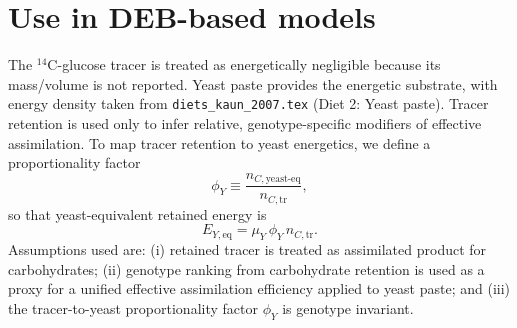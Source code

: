 \documentclass[11pt]{article}
\begin{document}
\section*{Use in DEB-based models}
The $^{14}$C-glucose tracer is treated as energetically negligible because its mass/volume is not reported. Yeast paste provides the energetic substrate, with energy density taken from \texttt{diets\_kaun\_2007.tex} (Diet 2: Yeast paste). Tracer retention is used only to infer relative, genotype-specific modifiers of effective assimilation. To map tracer retention to yeast energetics, we define a proportionality factor
\begin{equation}
  \phi_Y \equiv \frac{n_{C,\mathrm{yeast\text{-}eq}}}{n_{C,\mathrm{tr}}},
\end{equation}
so that yeast-equivalent retained energy is
\begin{equation}
  E_{Y,\mathrm{eq}} = \mu_Y\,\phi_Y\,n_{C,\mathrm{tr}}.
\end{equation}
Assumptions used are: (i) retained tracer is treated as assimilated product for carbohydrates; (ii) genotype ranking from carbohydrate retention is used as a proxy for a unified effective assimilation efficiency applied to yeast paste; and (iii) the tracer-to-yeast proportionality factor $\phi_Y$ is genotype invariant.
\end{document}
